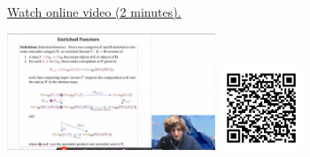 
\begin{minipage}{10cm}
    \href{https://act4e-spring21.netlify.app/videos/spring2021-enrichment:enriched-functors.html}{Watch online video (2 minutes).}
        
    \href{https://act4e-spring21.netlify.app/videos/spring2021-enrichment:enriched-functors.html}{\includegraphics[height=3.5cm]{spring2021-enrichment:enriched-functors/thumbnails.jpg}}
    \href{https://act4e-spring21.netlify.app/videos/spring2021-enrichment:enriched-functors.html}{\includegraphics[height=2.5cm]{spring2021-enrichment:enriched-functors/qrcode.png}}
\end{minipage}
